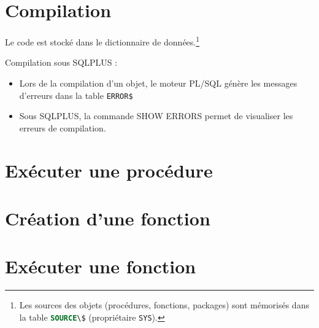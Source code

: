 \documentclass[10pt]{beamer}
\begin{document}
\section{Compilation}
\begin{frame}{\secname}
    
    Le code est stocké dans le dictionnaire de données.\footnote{Les sources des objets (procédures, fonctions, packages) sont mémorisés dans la table \lstinline[language=sql]!SOURCE\$! (propriétaire \lstinline[language=sql]!SYS!).}
\end{frame}

\begin{frame}{\secname}
    Compilation sous SQLPLUS :
    \begin{itemize}
        \item Lors de la compilation d'un objet, le moteur PL/SQL génère les messages d'erreurs dans la table \lstinline[language=sql]!ERROR$!
        \item Sous SQLPLUS, la commande SHOW ERRORS permet de visualiser les erreurs de compilation.
    \end{itemize}
\end{frame}

\section{Exécuter une procédure}
\begin{frame}{\secname}
    
\end{frame}

\section{Création d’une fonction}
\begin{frame}{\secname}
    
\end{frame}

\begin{frame}[allowframebreaks]{\secname}
    
\end{frame}

\section{Exécuter une fonction}
\begin{frame}{\secname}
    
\end{frame}
\end{document}
